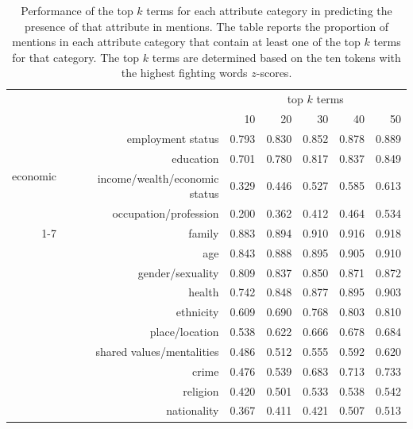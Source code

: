 \begin{table}[!th]
\centering
\caption{Performance of the top $k$ terms for each attribute category in predicting the presence of that attribute in mentions. The table reports the proportion of mentions in each attribute category that contain at least one of the top $k$ terms for that category. The top $k$ terms are determined based on the ten tokens with the highest fighting words $z$-scores.}
\label{tableC04}
\begin{tabular}{rrrrrrr}
\toprule
 &  & \multicolumn{5}{c}{top $k$ terms} \\
 &  & 10 & 20 & 30 & 40 & 50 \\
\midrule
\multirow[t]{4}{*}{economic} & employment status & 0.793 & 0.830 & 0.852 & 0.878 & 0.889 \\
 & education & 0.701 & 0.780 & 0.817 & 0.837 & 0.849 \\
 & income/wealth/economic status & 0.329 & 0.446 & 0.527 & 0.585 & 0.613 \\
 & occupation/profession & 0.200 & 0.362 & 0.412 & 0.464 & 0.534 \\
\cmidrule(lr){1-7}
\multirow[t]{10}{*}{noneconomic} & family & 0.883 & 0.894 & 0.910 & 0.916 & 0.918 \\
 & age & 0.843 & 0.888 & 0.895 & 0.905 & 0.910 \\
 & gender/sexuality & 0.809 & 0.837 & 0.850 & 0.871 & 0.872 \\
 & health & 0.742 & 0.848 & 0.877 & 0.895 & 0.903 \\
 & ethnicity & 0.609 & 0.690 & 0.768 & 0.803 & 0.810 \\
 & place/location & 0.538 & 0.622 & 0.666 & 0.678 & 0.684 \\
 & shared values/mentalities & 0.486 & 0.512 & 0.555 & 0.592 & 0.620 \\
 & crime & 0.476 & 0.539 & 0.683 & 0.713 & 0.733 \\
 & religion & 0.420 & 0.501 & 0.533 & 0.538 & 0.542 \\
 & nationality & 0.367 & 0.411 & 0.421 & 0.507 & 0.513 \\
\bottomrule
\end{tabular}
\end{table}
